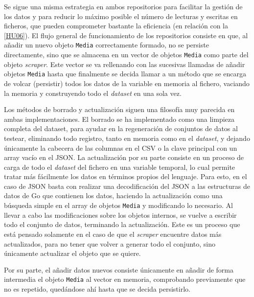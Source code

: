 Se sigue una misma estrategia en ambos repositorios para facilitar la gestión de
los datos y para reducir lo máximo posible el número de lecturas y escritas en
ficheros, que pueden comprometer bastante la eficiencia (en relación con la
\href{https://github.com/jlgallego99/TropesToGo/issues/45}{[HU06]}). El flujo
general de funcionamiento de los repositorios consiste en que, al añadir un
nuevo objeto \texttt{Media} correctamente formado, no se persiste directamente,
sino que se almacena en un vector de objetos \texttt{Media} como parte del
objeto \textit{scraper}. Este vector se va rellenando con las sucesivas llamadas
de añadir objetos \texttt{Media} hasta que finalmente se decida llamar a un
método que se encarga de volcar (persistir) todos los datos de la variable en
memoria al fichero, vaciando la memoria y construyendo todo el \textit{dataset}
en una sola vez.

Los métodos de borrado y actualización siguen una filosofía muy parecida en
ambas implementaciones. El borrado se ha implementado como una limpieza completa
del dataset, para ayudar en la regeneración de conjuntos de datos al testear,
eliminando todo registro, tanto en memoria como en el \textit{dataset}, y
dejando únicamente la cabecera de las columnas en el CSV o la clave principal
con un array vacío en el JSON. La actualización por su parte consiste en un
proceso de carga de todo el \textit{dataset} del fichero en una variable
temporal, lo cual permite tratar más fácilmente los datos en términos propios
del lenguaje. Para esto, en el caso de JSON basta con realizar una
decodificación del JSON a las estructuras de datos de Go que contienen los
datos, haciendo la actualización como una búsqueda simple en el array de objetos \texttt{Media} 
y modificando lo necesario. Al llevar a cabo las modificaciones sobre los
objetos internos, se vuelve a escribir todo el conjunto de datos, terminando la
actualización. Este es un proceso que está pensado solamente en el caso de que
el \textit{scraper} encuentre datos más actualizados, para no tener que volver a
generar todo el conjunto, sino únicamente actualizar el objeto que se quiere.

Por su parte, el añadir datos nuevos consiste únicamente en añadir de forma
intermedia el objeto \texttt{Media} al vector en memoria, comprobando
previamente que no es repetido, quedándose ahí hasta que se decida persistirlo.

